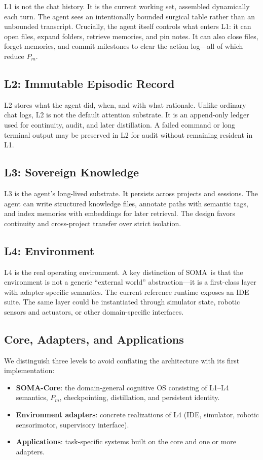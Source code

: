 \documentclass[11pt,a4paper]{article}
\newcommand{\soma}{\textsc{SOMA}}
\newcommand{\Pm}{\ensuremath{P_m}}
\begin{document}
L1 is not the chat history.
It is the current working set, assembled dynamically each turn.
The agent sees an intentionally bounded surgical table rather than an
unbounded transcript.
Crucially, the agent itself controls what enters L1: it can open files,
expand folders, retrieve memories, and pin notes.
It can also close files, forget memories, and commit milestones to clear
the action log---all of which reduce \Pm.

\subsection{L2: Immutable Episodic Record}

L2 stores what the agent did, when, and with what rationale.
Unlike ordinary chat logs, L2 is not the default attention substrate.
It is an append-only ledger used for continuity, audit, and later distillation.
A failed command or long terminal output may be preserved in L2 for audit
without remaining resident in L1.

\subsection{L3: Sovereign Knowledge}

L3 is the agent's long-lived substrate.
It persists across projects and sessions.
The agent can write structured knowledge files, annotate paths with semantic
tags, and index memories with embeddings for later retrieval.
The design favors continuity and cross-project transfer over strict isolation.

\subsection{L4: Environment}

L4 is the real operating environment.
A key distinction of \soma\ is that the environment is not a generic
``external world'' abstraction---it is a first-class layer with
adapter-specific semantics.
The current reference runtime exposes an IDE suite.
The same layer could be instantiated through simulator state, robotic
sensors and actuators, or other domain-specific interfaces.

\subsection{Core, Adapters, and Applications}

We distinguish three levels to avoid conflating the architecture with its
first implementation:
\begin{itemize}[leftmargin=*]
  \item \textbf{SOMA-Core}: the domain-general cognitive OS consisting of
        L1--L4 semantics, \Pm, checkpointing, distillation, and
        persistent identity.
  \item \textbf{Environment adapters}: concrete realizations of L4
        (IDE, simulator, robotic sensorimotor, supervisory interface).
  \item \textbf{Applications}: task-specific systems built on the core
        and one or more adapters.
\end{itemize}
\end{document}
